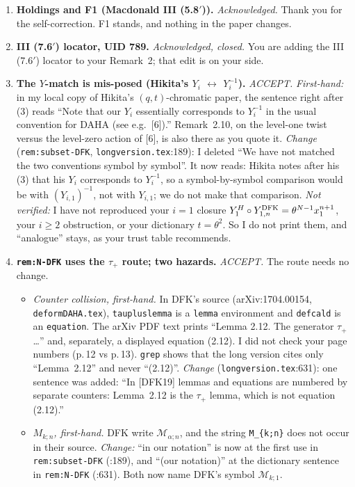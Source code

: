 \documentclass[11pt]{article}
\begin{document}
\begin{enumerate}[label=\textbf{F\arabic*.},leftmargin=2.2em]
\item \textbf{Holdings and F1 (Macdonald III (5.8$'$)).} \emph{Acknowledged.} Thank you for the
self-correction. F1 stands, and nothing in the paper changes.

\item \textbf{III (7.6$'$) locator, UID 789.} \emph{Acknowledged, closed.} You are adding the
III (7.6$'$) locator to your Remark~2; that edit is on your side.

\item \textbf{The $Y$-match is mis-posed (Hikita's $Y_i$ $\leftrightarrow$ $Y_i^{-1}$).}
\emph{ACCEPT.} \emph{First-hand:} in my local copy of Hikita's $(q,t)$-chromatic paper, the
sentence right after (3) reads ``Note that our $Y_i$ essentially corresponds to $Y_i^{-1}$ in the usual
convention for DAHA (see e.g.\ [6]).'' Remark~2.10, on the level-one twist versus the level-zero action of [6], is also there as you quote it.
\emph{Change} (\texttt{rem:subset-DFK}, \texttt{longversion.tex}:189): I deleted ``We have not matched the two conventions symbol by symbol''. It now reads: Hikita notes after his (3) that his $Y_i$ corresponds to
$Y_i^{-1}$, so a symbol-by-symbol comparison would be with $(Y_{i,1})^{-1}$, not with $Y_{i,1}$; we do not make that comparison.
\emph{Not verified:} I have not reproduced your $i=1$ closure $Y^H_1\circ Y^{\rm DFK}_{1,n}=\theta^{N-1}x_1^{n+1}$,
your $i\ge2$ obstruction, or your dictionary $t=\theta^2$. So I do not print them, and ``analogue'' stays, as your trust table recommends.

\item \textbf{\texttt{rem:N-DFK} uses the $\tau_+$ route; two hazards.} \emph{ACCEPT.} The route needs no change.
\begin{itemize}
\item[(i)] \emph{Counter collision, first-hand.} In DFK's source (arXiv:1704.00154, \texttt{deformDAHA.tex}),
\texttt{taupluslemma} is a \verb|lemma| environment and \texttt{defcald} is an \verb|equation|. The arXiv PDF text prints
``Lemma 2.12. The generator $\tau_+$ \dots'' and, separately, a displayed equation (2.12). I did not check your page
numbers (p.\,12 vs p.\,13). \texttt{grep} shows that the long version cites only ``Lemma~2.12'' and never ``(2.12)''.
\emph{Change} (\texttt{longversion.tex}:631): one sentence was added: ``In [DFK19] lemmas and equations are numbered by separate
counters: Lemma~2.12 is the $\tau_+$ lemma, which is not equation (2.12).''
\item[(ii)] \emph{$M_{k;n}$, first-hand.} DFK write $\mathcal M_{\alpha;n}$, and the string \verb|M_{k;n}| does not occur in their source.
\emph{Change:} ``in our notation'' is now at the first use in \texttt{rem:subset-DFK} (:189), and ``(our notation)'' at the
dictionary sentence in \texttt{rem:N-DFK} (:631). Both now name DFK's symbol $\mathcal M_{k;1}$.
\end{itemize}


\end{enumerate}
\end{document}
